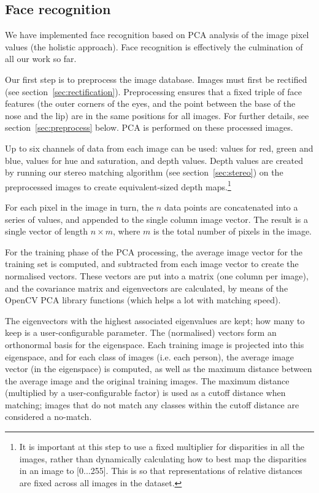 
\subsection{Face recognition}
\label{sec:face-rec}
We have implemented face recognition based on PCA analysis of the image pixel
values (the holistic approach). Face recognition is effectively the culmination of all our work so far.

Our first step is to preprocess the image database. Images must first be rectified (see section~\ref{sec:rectification}). Preprocessing ensures that a fixed triple of face features (the outer corners of the eyes, and the point between the base of the nose and the lip) are in the same positions for all images. For further details, see section~\ref{sec:preprocess} below. PCA is performed on these processed images.

Up to six channels of data from each image can be used: values for red, green and blue, values for hue and saturation, and depth values. Depth values are created by running our stereo matching algorithm (see section~\ref{sec:stereo}) on the preprocessed images to create equivalent-sized depth maps.\footnote{ It is important at this step to use a fixed multiplier for disparities in all the images, rather than dynamically calculating how to best map the disparities in an image to [0...255]. This is so that representations of relative distances are fixed across all images in the dataset.}

For each pixel in the image in turn, the $n$ data points are concatenated into a series of values, and appended to the single column image vector. The result is a single vector of length $n \times m$, where $m$ is the total number of pixels in the image.

For the training phase of the PCA processing, the average image vector for the
training set is computed, and subtracted from each image vector to create the normalised vectors. These vectors
are put into a matrix (one column per image), and the covariance matrix and
eigenvectors are calculated, by means of the OpenCV PCA library functions (which
helps a lot with matching speed).

The eigenvectors with the highest associated eigenvalues are kept; how many to
keep is a user-configurable parameter. The (normalised) vectors form an
orthonormal basis for the eigenspace. Each training image is projected into this
eigenspace, and for each class of images (i.e. each person), the average image
vector (in the eigenspace) is computed, as well as the maximum distance between
the average image and the original training images. The maximum distance
(multiplied by a user-configurable factor) is used as a cutoff distance when
matching; images that do not match any classes within the cutoff distance are
considered a no-match.

